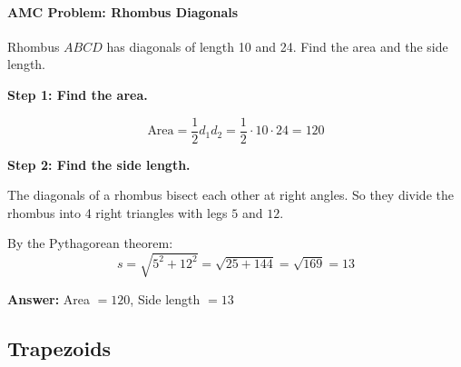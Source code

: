 ﻿\documentclass[12pt]{extarticle}
\begin{document}
\paragraph{AMC Problem: Rhombus Diagonals}

Rhombus $ABCD$ has diagonals of length 10 and 24. Find the area and the side length.

\begin{solutionbox}
\textbf{Step 1: Find the area.}

\[\text{Area} = \frac{1}{2}d_1 d_2 = \frac{1}{2} \cdot 10 \cdot 24 = 120\]

\textbf{Step 2: Find the side length.}

The diagonals of a rhombus bisect each other at right angles. So they divide the rhombus into 4 right triangles with legs $5$ and $12$.

By the Pythagorean theorem:
\[s = \sqrt{5^2 + 12^2} = \sqrt{25 + 144} = \sqrt{169} = 13\]

\textbf{Answer:} Area $= \boxed{120}$, Side length $= \boxed{13}$
\end{solutionbox}

\subsection{Trapezoids}
\end{document}
